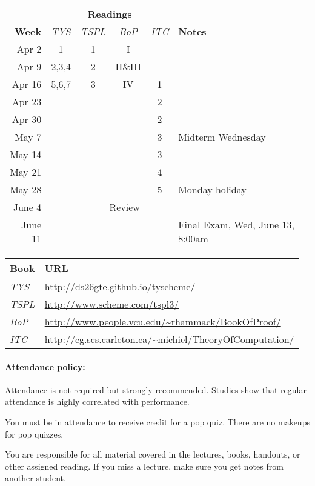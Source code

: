 \documentclass{article}
\begin{document}
  \begin{center}
\begin{tabular}{r|cccc|l}                      
 & \multicolumn{4}{c|}{\bf Readings} &  \\
{\bf Week} &\em TYS & \em TSPL &\em BoP&\em ITC & {\bf Notes} \\\hline  
Apr 2  & 1 & 1 & I   &   \\
Apr 9 & 2,3,4 & 2 & II\&III  & & \\
Apr 16 & 5,6,7 & 3 & IV  & 1 \\
Apr 23 &  &   &     & 2 \\
Apr 30 &  &   &     & 2 \\
May 7 &  &   &     & 3 & Midterm Wednesday \\
May 14 &  &   &     & 3 &\\
May 21 &  &   &     & 4\\
May 28 &  &   &     & 5 & Monday holiday\\
June 4 &  & \multicolumn{3}{c|}{Review} & \\                 
June 11 &  &   &     &   & Final Exam, Wed, June 13, 8:00am \\
\end{tabular}

\begin{tabular}{ll}
Book & URL\\\hline
{\em TYS} &       \url{http://ds26gte.github.io/tyscheme/} \\
{\em TSPL} & \url{http://www.scheme.com/tspl3/} \\
{\em BoP} & \url{http://www.people.vcu.edu/~rhammack/BookOfProof/}\\
{\em ITC} & \url{http://cg.scs.carleton.ca/~michiel/TheoryOfComputation/}\\
\end{tabular}

\end{center}

\paragraph{Attendance policy:} Attendance is not required but strongly
  recommended.  Studies show that regular attendance is highly
  correlated with performance.

  You must be in attendance to receive credit for a pop quiz.  There
  are no makeups for pop quizzes.

  You are responsible for all material covered in the lectures, books,
  handouts, or other assigned reading.  If you miss a lecture,
  make sure you get notes from another student.
\end{document}

